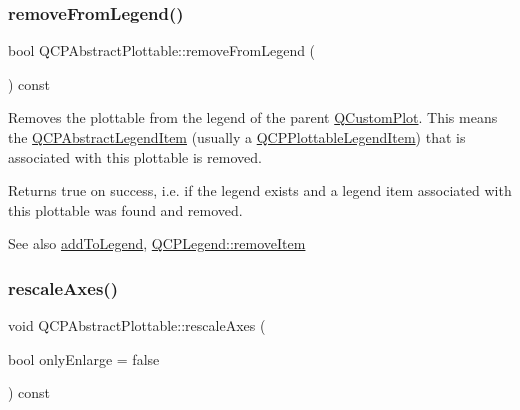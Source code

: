 \hypertarget{class_q_c_p_abstract_plottable_ac95fb2604d9106d0852ad9ceb326fe8c}{}\label{class_q_c_p_abstract_plottable_ac95fb2604d9106d0852ad9ceb326fe8c} 
\subsubsection{\texorpdfstring{remove\+From\+Legend()}{removeFromLegend()}}
{\footnotesize\ttfamily bool Q\+C\+P\+Abstract\+Plottable\+::remove\+From\+Legend (\begin{DoxyParamCaption}{ }\end{DoxyParamCaption}) const\hspace{0.3cm}{\ttfamily [virtual]}}

Removes the plottable from the legend of the parent \hyperlink{class_q_custom_plot}{Q\+Custom\+Plot}. This means the \hyperlink{class_q_c_p_abstract_legend_item}{Q\+C\+P\+Abstract\+Legend\+Item} (usually a \hyperlink{class_q_c_p_plottable_legend_item}{Q\+C\+P\+Plottable\+Legend\+Item}) that is associated with this plottable is removed.

Returns true on success, i.\+e. if the legend exists and a legend item associated with this plottable was found and removed.

\begin{DoxySeeAlso}{See also}
\hyperlink{class_q_c_p_abstract_plottable_a70f8cabfd808f7d5204b9f18c45c13f5}{add\+To\+Legend}, \hyperlink{class_q_c_p_legend_ac91595c3eaa746fe6321d2eb952c63bb}{Q\+C\+P\+Legend\+::remove\+Item} 
\end{DoxySeeAlso}
\hypertarget{class_q_c_p_abstract_plottable_a1491c4a606bccd2d09e65e11b79eb882}{}\label{class_q_c_p_abstract_plottable_a1491c4a606bccd2d09e65e11b79eb882} 
\subsubsection{\texorpdfstring{rescale\+Axes()}{rescaleAxes()}}
{\footnotesize\ttfamily void Q\+C\+P\+Abstract\+Plottable\+::rescale\+Axes (\begin{DoxyParamCaption}\item[{bool}]{only\+Enlarge = {\ttfamily false} }\end{DoxyParamCaption}) const}

